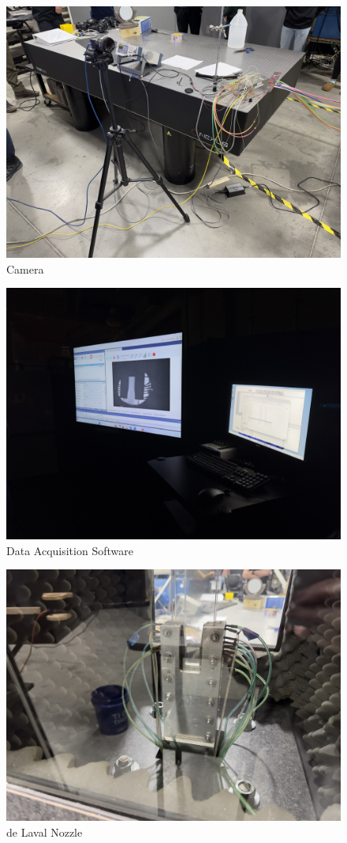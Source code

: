 \begin{figure}[htpb]
    \centering
    \includegraphics[width=0.75\linewidth]{Figures/camera.jpeg}
    \caption[Camera]{Camera}
    \label{fig: Camera}
\end{figure}

\begin{figure}[htpb]
    \centering
    \includegraphics[width=0.75\linewidth]{Figures/data_acquisition_software.jpeg}
    \caption[Data Acquisition Software]{Data Acquisition Software}
    \label{fig: DataAcquisition}
\end{figure}

\begin{figure}[htpb]
    \centering
    \includegraphics[width=0.75\linewidth]{Figures/de_laval_nozzle.jpeg}
    \caption[de Laval Nozzle]{de Laval Nozzle}
    \label{fig: deLavalNozzle}
\end{figure}


